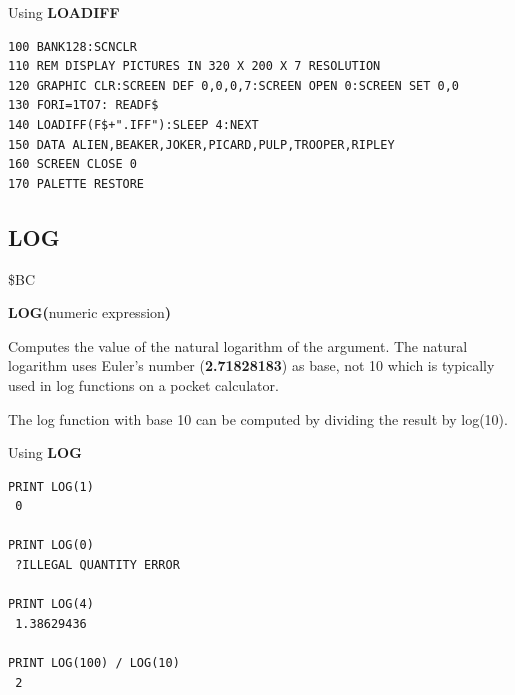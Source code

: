 \begin{description}[leftmargin=2cm,style=nextline]
\item [Example:] Using {\bf LOADIFF}
\begin{tcolorbox}[colback=black,coltext=white]
\verbatimfont{\codefont}
\begin{verbatim}
100 BANK128:SCNCLR
110 REM DISPLAY PICTURES IN 320 X 200 X 7 RESOLUTION
120 GRAPHIC CLR:SCREEN DEF 0,0,0,7:SCREEN OPEN 0:SCREEN SET 0,0
130 FORI=1TO7: READF$
140 LOADIFF(F$+".IFF"):SLEEP 4:NEXT
150 DATA ALIEN,BEAKER,JOKER,PICARD,PULP,TROOPER,RIPLEY
160 SCREEN CLOSE 0
170 PALETTE RESTORE
\end{verbatim}
\end{tcolorbox}
\end{description}


\newpage
\subsection{LOG}
\begin{description}[leftmargin=2cm,style=nextline]
\item [Token:] \$BC
\item [Format:] {\bf LOG(}numeric expression{\bf)}
\item [Usage:] Computes
               the value of the natural logarithm of the argument.
               The natural logarithm uses
               Euler's number ({\bf 2.71828183}) as base,
               not 10 which is typically used
               in log functions on a pocket calculator.

\item [Remarks:] The log function with base 10 can be computed
                 by dividing the result by log(10).
\item [Example:] Using {\bf LOG}
\begin{tcolorbox}[colback=black,coltext=white]
\verbatimfont{\codefont}
\begin{verbatim}
PRINT LOG(1)
 0

PRINT LOG(0)
 ?ILLEGAL QUANTITY ERROR

PRINT LOG(4)
 1.38629436

PRINT LOG(100) / LOG(10)
 2
\end{verbatim}
\end{tcolorbox}
\end{description}


\newpage
